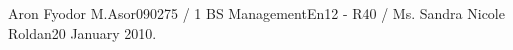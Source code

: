 \documentclass[letterpaper]{article}
\begin{document}
\begin{mla}{Aron Fyodor M.}{Asor}{090275 / 1 BS Management}{En12 - R40 / Ms. Sandra Nicole Roldan}{20 January 2010}{. }






			
			
			
			






\end{mla}
\end{document}
